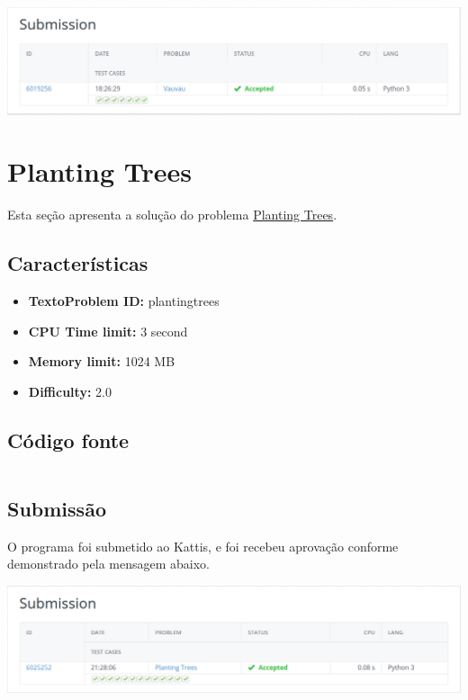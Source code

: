 \documentclass[11pt,a4paper]{scrreprt}
\begin{document}
\includegraphics[scale=0.47]{img/vauvau.png}

\section{Planting Trees}

Esta seção apresenta a solução do problema \href{https://open.kattis.com/problems/plantingtrees}{Planting Trees}.

\subsection{Características}

\begin{itemize}
    \item\textbf{TextoProblem ID: } plantingtrees
    \item\textbf{CPU Time limit: } 3 second
    \item\textbf{Memory limit: } 1024 MB
    \item\textbf{Difficulty: }  2.0
\end{itemize}

\subsection{Código fonte}

\inputminted[linenos]{python}{src/PlantingTrees.py}

\subsection{Submissão}
O programa foi submetido ao Kattis, e foi recebeu aprovação conforme demonstrado pela mensagem abaixo.

\includegraphics[scale=0.47]{img/PlantingTrees.png}
\end{document}
